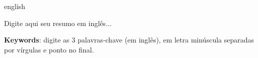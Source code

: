 \setlength{\absparsep}{18pt} %
\begin{resumo}[Abstract]
 \begin{otherlanguage*}{english}
   
   Digite aqui seu resumo em inglês...
   

   \vspace{\onelineskip}
 
   \noindent 
   \textbf{Keywords}: digite as 3 palavras-chave (em inglês), em letra minúscula separadas por vírgulas e ponto no final.
 \end{otherlanguage*}
\end{resumo}